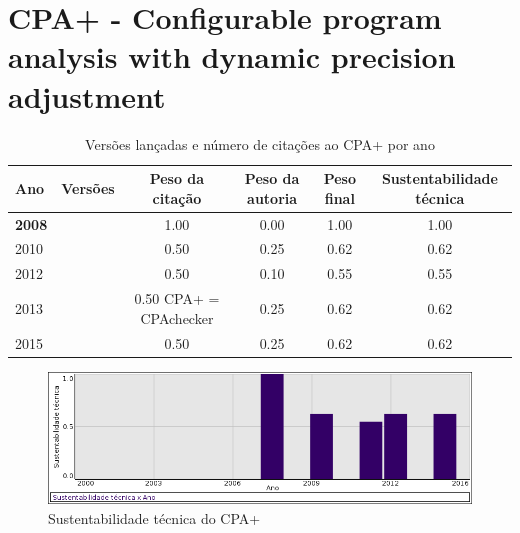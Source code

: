 \section{CPA+ - Configurable program analysis with dynamic precision adjustment}


\begin{table}[H]
\caption{Versões lançadas e número de citações ao CPA+ por ano}
\centering
\begin{tabular}{| l | c | c | c | c | c |}
  \hline
  Ano & Versões & Peso da citação & Peso da autoria & Peso final & Sustentabilidade técnica \\
  \hline
            {\bf 2008}
          &
          
          &
          1.00
          &
          0.00
          &
          1.00
          &
            {\color{blue} 1.00}
          \\
\hline
            2010
          &
          
          &
          0.50
          &
          0.25
          &
          0.62
          &
            {\color{blue} 0.62}
          \\
\hline
            2012
          &
          
          &
          0.50
          &
          0.10
          &
          0.55
          &
            {\color{blue} 0.55}
          \\
\hline
            2013
          &
          
          &
          0.50
            {\tiny CPA+ = CPAchecker}
          &
          0.25
          &
          0.62
          &
            {\color{blue} 0.62}
          \\
\hline
            2015
          &
          
          &
          0.50
          &
          0.25
          &
          0.62
          &
            {\color{blue} 0.62}
          \\
\hline
\end{tabular}
\end{table}

\begin{figure}[h]
  \center
  \includegraphics[scale=0.50]{imagens/softwares-charts/cpa+.png}
  \caption{Sustentabilidade técnica do CPA+}
\end{figure}


